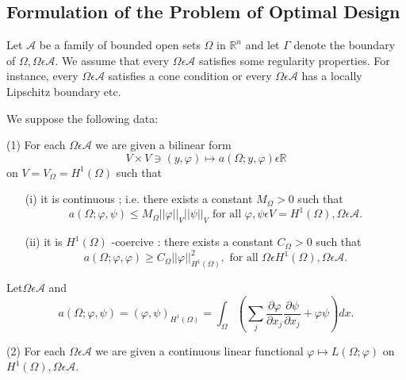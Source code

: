 \subsection{Formulation of the Problem of Optimal Design}\label{chap6-subsec2.1}

Let $\mathscr{A}$ be a family of bounded open sets $\Omega$ in
$\mathbb{R}^{n}$ and let $\Gamma$ denote the boundary of $\Omega,
\Omega \epsilon \mathscr{A}$. We assume that every $\Omega \epsilon
\mathscr{A}$ satisfies some regularity properties. For instance, every
$\Omega \epsilon \mathscr{A}$ satisfies a cone condition or every
$\Omega \epsilon \mathscr{A}$ has a locally Lipschitz boundary etc. 

We suppose the following data:

(1) For each $\Omega \epsilon \mathscr{A}$ we are given a bilinear form
$$
V \times V \ni (y, \varphi) \mapsto a(\Omega ; y, \varphi) \epsilon \mathbb{R}
$$
on $V = V_{\Omega} = H^{1} (\Omega)$ such that
\begin{enumerate}
\item[(i)] it is continuous ; i.e. there exists a constant $M_{\Omega} > 0$ such that
\begin{equation*}
a(\Omega ; \varphi, \psi) \leq M_{\Omega} ||\varphi||_{V} ||\psi||_{V}
\text{ for all } \varphi, \psi \epsilon V = H^{1}(\Omega), \Omega
\epsilon \mathscr{A}.\tag{2.1}\label{chap6-eq2.1} 
\end{equation*}
\item[(ii)] it is $H^{1} (\Omega)$ -coercive : there exists a constant $C_{\Omega} > 0$ such that
\begin{equation*}
a(\Omega ; \varphi, \varphi) \geq C_{\Omega} ||\varphi||_{H^{1} (\Omega)}^{2}, \text{ for all } \Omega \epsilon H^{1} (\Omega), \Omega \epsilon \mathscr{A}.\tag{2.2}\label{chap6-eq2.2}
\end{equation*}
\end{enumerate}

\begin{example}\label{chap6-exam2.1}
Let\pageoriginale $\Omega \epsilon \mathscr{A}$ and
$$
a(\Omega; \varphi, \psi) = (\varphi, \psi)_{H^{1} (\Omega)} = \int_{\Omega} \left(\sum_{j} \frac{\partial \varphi}{\partial x_{j}} \frac{\partial \psi}{\partial x_{j}} + \varphi \psi \right)dx.
$$
\end{example}

(2) For each $\Omega \epsilon \mathscr{A}$ we are given a continuous linear functional $\varphi \mapsto L(\Omega ; \varphi)$ on $H^{1} (\Omega), \Omega \epsilon \mathscr{A}$.

